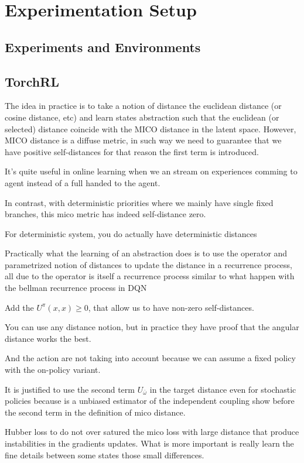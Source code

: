 \section{Experimentation Setup}

\subsection{Experiments and Environments}
\subsection{TorchRL}

The idea in practice is to take a notion of distance the euclidean distance (or cosine distance, etc) and learn states abstraction such that the euclidean (or selected) distance coincide with the MICO distance in the latent space. However, MICO distance is a diffuse metric, in such way we need to guarantee that we have positive self-distances for that reason the first term is introduced.


It's quite useful in online learning when we an stream on experiences comming to agent instead of a full handed to the agent.


In contrast, with deterministic priorities where we mainly have single fixed branches, this mico metric has indeed self-distance zero.


For deterministic system, you do actually have deterministic distances

Practically what the learning of an abstraction does is to use the operator and parametrized notion of distances to update the distance in a recurrence process, all due to the operator is itself a recurrence process similar to what happen with the bellman recurrence process in DQN

Add the $U^\pi(x,x) \geq 0$, that allow us to have non-zero self-distances.

You can use any distance notion, but in practice they have proof that the angular distance works the best.

And the action are not taking into account because we can assume a fixed policy with the on-policy variant.

It is justified to use the second term $U_\bar{\omega}$ in the target distance even for stochastic policies because is a unbiased estimator of the independent coupling show before the second term in the definition of mico distance.

Hubber loss to do not over satured the mico loss with large distance that produce instabilities in the gradients updates. What is more important is really learn the fine details between some states those small differences.

